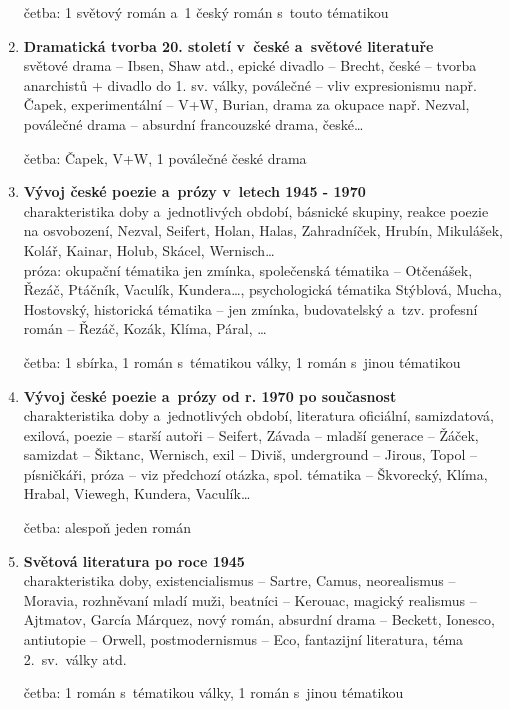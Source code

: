 \begin{enumerate}
četba: 1 světový román a~1 český román  s~touto tématikou     

\item \textbf{Dramatická tvorba 20. století v~české a~světové literatuře} \\
světové drama -- Ibsen, Shaw atd., epické divadlo -- Brecht, české --
tvorba anarchistů + divadlo do 1. sv. války, poválečné -- vliv
expresionismu  např. Čapek, experimentální -- V+W, Burian, drama za
okupace např. Nezval, poválečné drama -- absurdní francouzské drama, 
české\dots 

četba: Čapek, V+W, 1 poválečné české drama 
   
\item \textbf{Vývoj české poezie a~prózy v~letech 1945 - 1970} \\
charakteristika doby a~jednotlivých období, básnické skupiny, reakce
poezie na osvobození, Nezval, Seifert, Holan, 
Halas, Zahradníček, Hrubín, Mikulášek, Kolář, Kainar, Holub, Skácel, 
Wernisch\dots \\ 
próza: okupační tématika jen zmínka, společenská tématika --
Otčenášek, Řezáč, Ptáčník, Vaculík, Kundera\dots, psychologická tématika
Stýblová, Mucha, Hostovský, historická tématika -- jen zmínka, budovatelský
a~tzv. profesní román -- Řezáč, Kozák, Klíma, Páral, \dots 

četba:  1 sbírka, 1 román s~tématikou války, 1 román s~jinou tématikou

\item \textbf{Vývoj české poezie a~prózy od r. 1970 po současnost} \\
charakteristika doby a~jednotlivých období, literatura oficiální, 
samizdatová, exilová, poezie -- starší autoři -- Seifert, Závada -- mladší
generace -- Žáček, samizdat -- Šiktanc, Wernisch, exil -- Diviš, 
underground -- Jirous, Topol -- písničkáři, próza -- viz předchozí otázka, 
spol. tématika -- Škvorecký, Klíma, Hrabal, Viewegh, Kundera, Vaculík\dots

četba: alespoň jeden román

\item \textbf{Světová literatura po roce 1945} \\
charakteristika doby, existencialismus -- Sartre, Camus, neorealismus --
Moravia, rozhněvaní mladí muži, beatníci -- Kerouac, magický realismus --
Ajtmatov, García Márquez, nový román, absurdní drama -- Beckett, Ionesco, 
antiutopie -- Orwell, postmodernismus -- Eco, fantazijní literatura, téma 
2.~sv.~války atd.

četba: 1 román s~tématikou války, 1 román s~jinou tématikou 


\end{enumerate}
